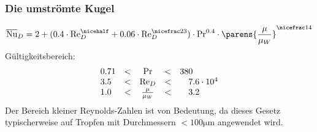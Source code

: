 		\subsubsection{Die umströmte Kugel} %
			\[
				\overline{\mathrm{Nu}}_D = 2+(0.4 \cdot \mathrm{Re}_D^{\nicehalf} + 0.06 \cdot \mathrm{Re}_D^{\nicefrac 2 3}) \cdot \mathrm{Pr}^{0.4} \cdot \parens{\frac{\mu}{\mu_W}}^{\nicefrac 1 4}
			\]
			Gültigkeitsbereich:
			\[
				\begin{array}{r@{.}l@{\quad<\quad}c@{\quad<\quad}r@{}l}
					0&71 & \mathrm{Pr} & 380 & \\
					3&5 & \mathrm{Re}_D & 7&.6\cdot 10^4 \\
					1&0 & \frac{\mu}{\mu_W} & 3&.2
				\end{array}
			\]
			Der Bereich kleiner Reynolds-Zahlen ist von Bedeutung, da dieses Gesetz typischerweise auf Tropfen mit Durchmessern $< 100\si{\micro\metre}$ angewendet wird.
